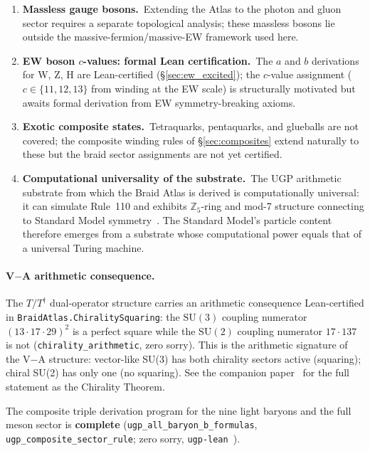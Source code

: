 \documentclass[11pt]{article}
\theoremstyle{remark}
\begin{document}
\begin{enumerate}[leftmargin=2em,itemsep=0.2em]
  \item \textbf{Massless gauge bosons.}~Extending the Atlas to the photon
    and gluon sector requires a separate topological analysis; these massless
    bosons lie outside the massive-fermion/massive-EW framework used here.
  \item   \textbf{EW boson $c$-values: formal Lean certification.}~The
    $a$ and $b$ derivations for W, Z, H are Lean-certified (\S\ref{sec:ew_excited});
    the $c$-value assignment ($c \in \{11,12,13\}$ from winding
    at the EW scale) is structurally motivated but awaits formal derivation
    from EW symmetry-breaking axioms.
  \item \textbf{Exotic composite states.}~Tetraquarks, pentaquarks, and glueballs
    are not covered; the composite winding rules of \S\ref{sec:composites} extend
    naturally to these but the braid sector assignments are not yet certified.
  \item \textbf{Computational universality of the substrate.}~The UGP arithmetic
    substrate from which the Braid Atlas is derived is computationally universal:
    it can simulate Rule~110 and exhibits $\mathbb{Z}_5$-ring and mod-7 structure
    connecting to Standard Model symmetry~\cite{SpivackCompUniversality}.  The
    Standard Model's particle content therefore emerges from a substrate whose
    computational power equals that of a universal Turing machine.
\end{enumerate}

\paragraph{V$-$A arithmetic consequence.}
The $T/T^\dagger$ dual-operator structure carries an arithmetic consequence
Lean-certified in \texttt{BraidAtlas.ChiralitySquaring}:
the $\mathrm{SU}(3)$ coupling numerator $(13\cdot17\cdot29)^2$ is a perfect square
while the $\mathrm{SU}(2)$ coupling numerator $17\cdot137$ is not
(\texttt{chirality\_arithmetic}, zero sorry).
This is the arithmetic signature of the V$-$A structure: vector-like SU(3) has
both chirality sectors active (squaring); chiral SU(2) has only one (no squaring).
See the companion paper~\cite{Spivack2026_Uniqueness25} for the full statement
as the Chirality Theorem.

The composite triple derivation program for the nine light baryons and the full meson sector is \textbf{complete} (\texttt{ugp\_all\_baryon\_b\_formulas}, \texttt{ugp\_composite\_sector\_rule}; zero sorry, \texttt{ugp-lean}~\cite{SpivackUGPFormalization,ugp-lean}).
\end{document}
